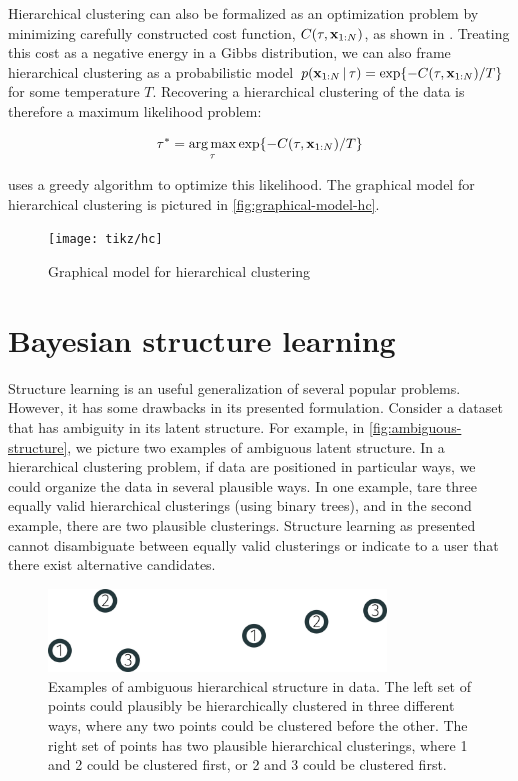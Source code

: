 Hierarchical clustering can also be formalized as an optimization problem
by minimizing carefully constructed cost
function,
$C(\tau, \mathbf{x}_{1:N})$,
as shown in \cite{Dasgupta2016}.
Treating this cost as a negative
energy in a Gibbs distribution,
we can also frame hierarchical clustering
as a probabilistic model
$\p(\dataset \given \tree) = \exp{-C(\tau, \dataset)/T}$ for some temperature $T$.
Recovering a hierarchical clustering of the
data is therefore a maximum likelihood problem:

\begin{align*}
    \tree^* = \argmax_{\tree} \exp{-C(\tau, \dataset)/T}
\end{align*}

\cite{Dasgupta2016AClustering} uses a greedy algorithm
to optimize this likelihood.
The graphical model for hierarchical clustering is pictured in \autoref{fig:graphical-model-hc}.

\begin{figure}[htp!]
    \centering
    \texttt{[image: tikz/hc]}
    \caption{Graphical model for hierarchical clustering}
    \label{fig:graphical-model-hc}
\end{figure}

\section{Bayesian structure learning}

Structure learning is an useful generalization
of several popular problems. However, it has some
drawbacks in its presented formulation.
Consider a dataset that has ambiguity in its
latent structure. For example, in \autoref{fig:ambiguous-structure}, we picture two examples of ambiguous latent structure. In a hierarchical clustering problem, if data are positioned in particular ways, we could organize the data
in several plausible ways. In one example, tare
three equally valid hierarchical clusterings (using binary trees), and in the second example, there are two
plausible clusterings. Structure learning as presented
cannot disambiguate between equally valid clusterings or indicate to a user that there exist alternative candidates.

\begin{figure}[htp!]
    \centering
    \includegraphics[width=0.8\textwidth]{img/structure/3-cluster-both}
    \caption{Examples of ambiguous hierarchical structure in data. The left set of points could plausibly be hierarchically clustered in three different ways, where any two points could be clustered before the other. The right set of points has two plausible hierarchical clusterings, where 1 and 2 could be clustered first, or 2 and 3 could be clustered first.}
    \label{fig:ambiguous-structure}
\end{figure}

